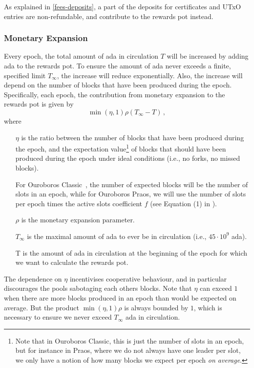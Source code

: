 \documentclass[11pt,a4paper,dvipsnames,twosided]{article}
\newcommand{\citep}[1]{\cite{#1}}
\begin{document}
As explained in \cref{fees-deposits}, a part of the deposits for
certificates and UTxO entries are non-refundable, and contribute to
the rewards pot instead.

\subsubsection{Monetary Expansion}
\label{monetary-expansion}

Every epoch, the total amount of ada in circulation \(T\) will be increased by
adding ada to the rewards pot. To ensure the amount of ada never exceeds a
finite, specified limit \(T_\infty\), the increase will reduce exponentially.
Also, the increase will depend on the number of blocks that have been produced
during the epoch. Specifically, each epoch, the contribution from monetary
expansion to the rewards pot is given by
\[\min(\eta, 1) \rho \left(T_\infty - T\right)\,,\]
where
\begin{itemize}
\item[\(\eta\)] is the ratio between the number of blocks that have been produced
  during the epoch, and the expectation value\footnote{Note that in Ouroboros
    Classic, this is just the number of slots in an epoch, but for instance in
    Praos, where we do not always have one leader per slot, we only have a
    notion of how many blocks we expect per epoch \emph{on average}.} of blocks
  that should have been produced during the epoch under ideal conditions (i.e.,
  no forks, no missed blocks).

  For Ouroboros Classic~\citep{ouroboros_classic}, the number of expected blocks
  will be the number of slots in an epoch, while for Ouroboros Praos, we will
  use the number of slots per epoch times the active slots coefficient \(f\)
  (see Equation (1) in \citep{ouroboros_praos}).
\item[\(\rho\)] is the monetary expansion parameter.
\item[\(T_\infty\)] is the maximal amount of ada to ever be in circulation
  (i.e., \(45\cdot10^{9}\) ada).
\item[T] is the amount of ada in circulation at the beginning of the epoch for
  which we want to calculate the rewards pot.
\end{itemize}

The dependence on \(\eta\) incentivises cooperative behaviour, and in particular
discourages the pools sabotaging each others blocks. Note that \(\eta\) can
exceed \(1\) when there are more blocks produced in an epoch than would be
expected on average. But the product \(\min(\eta, 1)\rho\) is always bounded by
\(1\), which is necessary to ensure we never exceed \(T_\infty\) ada in
circulation.
\end{document}
